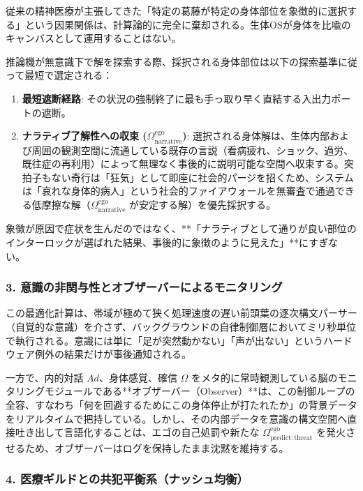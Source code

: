 従来の精神医療が主張してきた「特定の葛藤が特定の身体部位を象徴的に選択する」という因果関係は、計算論的に完全に棄却される。生体OSが身体を比喩のキャンバスとして運用することはない。

推論機が無意識下で解を探索する際、採択される身体部位は以下の探索基準に従って最短で選定される：

\begin{enumerate}
    \item \textbf{最短遮断経路}: その状況の強制終了に最も手っ取り早く直結する入出力ポートの遮断。
    \item \textbf{ナラティブ了解性への収束 ($\Omega^{\mathrm{ego}}_{\mathrm{narrative}}$)}: 選択される身体解は、生体内部および周囲の観測空間に流通している既存の言説（看病疲れ、ショック、過労、既往症の再利用）によって無理なく事後的に説明可能な空間へ収束する。突拍子もない奇行は「狂気」として即座に社会的パージを招くため、システムは「哀れな身体的病人」という社会的ファイアウォールを無審査で通過できる低摩擦な解（$\Omega^{\mathrm{ego}}_{\mathrm{narrative}}$ が安定する解）を優先採択する。
\end{enumerate}

象徴が原因で症状を生んだのではなく、**「ナラティブとして通りが良い部位のインターロックが選ばれた結果、事後的に象徴のように見えた」**にすぎない。

\subsubsection{3. 意識の非関与性とオブザーバーによるモニタリング}

この最適化計算は、帯域が極めて狭く処理速度の遅い前頭葉の逐次構文パーサー（自覚的な意識）を介さず、バックグラウンドの自律制御層においてミリ秒単位で執行される。意識には単に「足が突然動かない」「声が出ない」というハードウェア例外の結果だけが事後通知される。

一方で、内的対話 $Ad$、身体感覚、確信 $\Omega$ をメタ的に常時観測している脳のモニタリングモジュールである**オブザーバー（Observer）**は、この制御ループの全容、すなわち「何を回避するためにこの身体停止が打たれたか」の背景データをリアルタイムで把持している。しかし、その内部データを意識の構文空間へ直接吐き出して言語化することは、エゴの自己処罰や新たな $\Omega^{\mathrm{ego}}_{\mathrm{predict:threat}}$ を発火させるため、オブザーバーはログを保持したまま沈黙を維持する。

\subsubsection{4. 医療ギルドとの共犯平衡系（ナッシュ均衡）}

